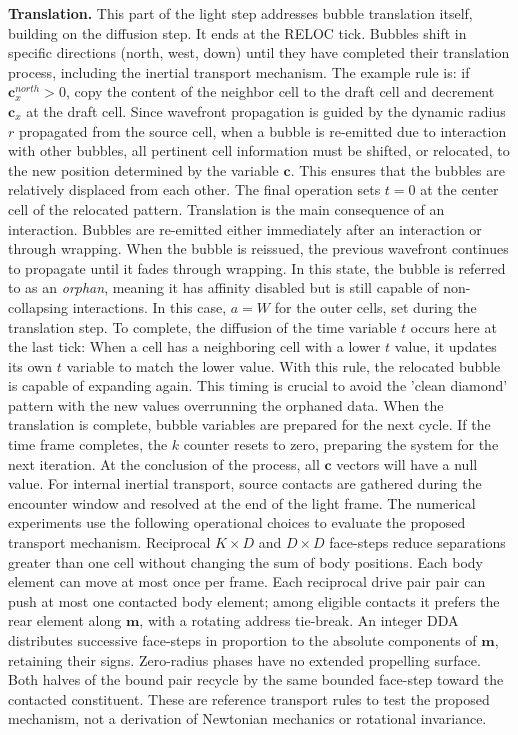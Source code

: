 \documentclass{ijuc}
\begin{document}
\medskip\noindent\textbf{Translation.} This part of the light step addresses bubble translation itself, building on the diffusion step.
It ends at the RELOC tick. Bubbles shift in specific directions (north, west, down) until they have completed their translation process, including the inertial transport mechanism.
The example rule is: if $\textbf{c}_x^{north}>0$, copy the content of the neighbor cell to the draft cell and decrement $\textbf{c}_x$ at the draft cell.
Since wavefront propagation is guided by the dynamic radius $r$ propagated from the source cell, when a bubble is re-emitted due to interaction with other bubbles, all pertinent cell information must be shifted, or relocated, to the new position determined by the variable $\textbf{c}$.
This ensures that the bubbles are relatively displaced from each other.
The final operation sets $t=0$ at the center cell of the relocated pattern.
Translation is the main consequence of an interaction.
Bubbles are re-emitted either immediately after an interaction or through wrapping.
When the bubble is reissued, the previous wavefront continues to propagate until it fades through wrapping.
In this state, the bubble is referred to as an \textit{orphan}, meaning it has affinity disabled but is still capable of non-collapsing interactions.
In this case, $a=W$ for the outer cells, set during the translation step.
To complete, the diffusion of the time variable $t$ occurs here at the last tick: When a cell has a neighboring cell with a lower $t$ value, it updates its own $t$ variable to match the lower value.
With this rule, the relocated bubble is capable of expanding again.
This timing is crucial to avoid the 'clean diamond' pattern with the new values overrunning the orphaned data.
When the translation is complete, bubble variables are prepared for the next cycle.
If the time frame completes, the $k$ counter resets to zero, preparing the system for the next iteration.
At the conclusion of the process, all $\boldsymbol{c}$ vectors will have a null value.
For internal inertial transport, source contacts are gathered during the encounter window and resolved at the end of the light frame. The numerical experiments use the following operational choices to evaluate the proposed transport mechanism. Reciprocal $K\times D$ and $D\times D$ face-steps reduce separations greater than one cell without changing the sum of body positions. Each body element can move at most once per frame. Each reciprocal drive pair pair can push at most one contacted body element; among eligible contacts it prefers the rear element along $\boldsymbol{m}$, with a rotating address tie-break. An integer DDA distributes successive face-steps in proportion to the absolute components of $\boldsymbol{m}$, retaining their signs. Zero-radius phases have no extended propelling surface. Both halves of the bound pair recycle by the same bounded face-step toward the contacted constituent. These are reference transport rules to test the proposed mechanism, not a derivation of Newtonian mechanics or rotational invariance.
\end{document}
